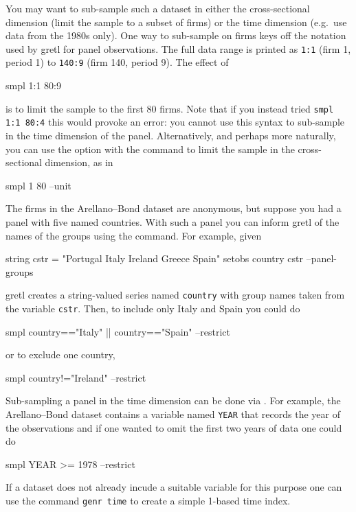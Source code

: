 You may want to sub-sample such a dataset in either the
cross-sectional dimension (limit the sample to a subset of firms) or
the time dimension (e.g.\ use data from the 1980s only). One way to
sub-sample on firms keys off the notation used by gretl for panel
observations. The full data range is printed as \texttt{1:1} (firm 1,
period 1) to \texttt{140:9} (firm 140, period 9). The effect of
%
\begin{code}
smpl 1:1 80:9
\end{code}
%
is to limit the sample to the first 80 firms. Note that if you instead
tried \texttt{smpl 1:1 80:4} this would provoke an error: you cannot
use this syntax to sub-sample in the time dimension of the
panel. Alternatively, and perhaps more naturally, you can use the
 option with the  command to limit the sample
in the cross-sectional dimension, as in
%
\begin{code}
smpl 1 80 --unit
\end{code}

The firms in the Arellano--Bond dataset are anonymous, but suppose you
had a panel with five named countries. With such a panel you can
inform gretl of the names of the groups using the 
command. For example, given
%
\begin{code}
string cstr = "Portugal Italy Ireland Greece Spain"
setobs country cstr --panel-groups 
\end{code}
%
gretl creates a string-valued series named \texttt{country} with group
names taken from the variable \texttt{cstr}. Then, to include only
Italy and Spain you could do
%
\begin{code}
smpl country=="Italy" || country=="Spain" --restrict
\end{code}
%
or to exclude one country,
%
\begin{code}
smpl country!="Ireland" --restrict
\end{code}

Sub-sampling a panel in the time dimension can be done via
.  For example, the Arellano--Bond dataset contains a
variable named \texttt{YEAR} that records the year of the observations
and if one wanted to omit the first two years of data one could do
%
\begin{code}
smpl YEAR >= 1978 --restrict
\end{code}
%
If a dataset does not already incude a suitable variable for this
purpose one can use the command \texttt{genr time} to create a simple
1-based time index.


